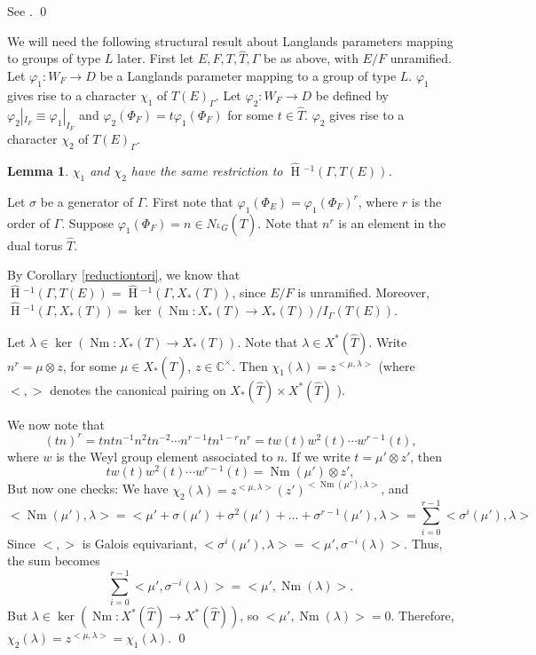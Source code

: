 \documentclass[11pt]{amsart}
\theoremstyle{plain}
\newtheorem{lemma}[theorem]{Lemma}
\newcommand{\HT}[1]{\hat{\HH}{}^{#1}}
\theoremstyle{definition}
\DeclareMathOperator{\HH}{H}
\DeclareMathOperator{\Nm}{Nm}
\begin{document}
\proof
See \cite{adrianlansky}.
\qed

We will need the following structural result about Langlands
parameters mapping to groups of type $L$ later.  First let $E,F,T,\hat{T}, \Gamma$
be as above, with $E/F$ unramified.  Let $\varphi_1 : W_F \rightarrow D$
be a Langlands parameter mapping to a group of type $L$.  $\varphi_1$
gives rise to a character $\chi_1$ of $T(E)_{\Gamma}$.  Let $\varphi_2
: W_F \rightarrow D$ be defined by $\varphi_2|_{I_F} \equiv \varphi_1|_{I_F}$ and
$\varphi_2(\Phi_F) = t \varphi_1(\Phi_F)$ for some $t \in \hat{T}$.
$\varphi_2$ gives rise to a character $\chi_2$ of $T(E)_{\Gamma}$.

\begin{lemma}\label{toralmodification}
$\chi_1$ and $\chi_2$ have the same restriction to $\HT{-1}(\Gamma, T(E))$.
\end{lemma}

\proof
Let $\sigma$ be a generator of $\Gamma$.  First note that
$\varphi_1(\Phi_E) = \varphi_1(\Phi_F)^r$, where $r$ is the 
order of $\Gamma$.
Suppose $\varphi_1(\Phi_F) = n \in N_{{}^L G}(\hat{T})$.
Note that $n^r$ is an element in the dual torus
$\hat{T}$.

By Corollary \ref{reductiontori}, we know that
$\HT{-1}(\Gamma, T(E)) = \HT{-1}(\Gamma, X_*(T))$,
since $E/F$ is unramified.  Moreover,
$\HT{-1}(\Gamma, X_*(T)) = \ker(\Nm : X_*(T) \rightarrow X_*(T)) / I_{\Gamma}(T(E))$.

Let $\lambda \in \ker(\Nm : X_*(T) \rightarrow X_*(T))$.  Note that
$\lambda \in X^*(\hat{T})$.
Write $n^r = \mu \otimes z$, for some $\mu \in X_*(\hat{T})$,
$z \in \mathbb{C}^\times$.  Then $\chi_1(\lambda) = z^{<\mu, \lambda>}$
(where $< , >$ denotes the canonical pairing
on $X_*(\hat{T}) \times X^*(\hat{T})$ ).

We now note that
$$(tn)^r = t ntn^{-1} n^2 t n^{-2} \cdots n^{r-1} t n^{1-r} n^r = t w(t) w^2(t) \cdots w^{r-1}(t),$$
where $w$ is the Weyl group element associated to $n$.  If we write
$t = \mu' \otimes z'$, then $$t w(t) w^2(t) \cdots w^{r-1}(t) = \Nm(\mu' ) \otimes z',$$
But now one checks:
We have $\chi_2(\lambda) = z^{<\mu, \lambda>} (z' )^{<\Nm(\mu'), \lambda>}$, and
$$<\Nm(\mu'), \lambda> = < \mu' + \sigma(\mu') + \sigma^2(\mu') + ... + \sigma^{r-1}(\mu'), \lambda>
  = \displaystyle\sum_{i=0}^{r-1} < \sigma^i(\mu'), \lambda >$$
Since $< , >$ is Galois equivariant, $<\sigma^i(\mu'), \lambda> =
<\mu', \sigma^{-i}(\lambda)>$.  Thus, the sum
becomes
$$\displaystyle\sum_{i=0}^{r-1} <\mu', \sigma^{-i}(\lambda)> = <\mu', \Nm(\lambda)>.$$
But $\lambda \in \ker(\Nm : X^*(\hat{T}) \rightarrow X^*(\hat{T}))$, so
$<\mu', \Nm(\lambda)> = 0$.  Therefore, $\chi_2(\lambda) =
z^{<\mu, \lambda>} = \chi_1(\lambda)$.
\qed
\end{document}
